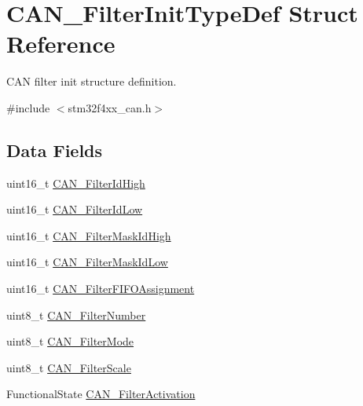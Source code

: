 \hypertarget{struct_c_a_n___filter_init_type_def}{\section{C\-A\-N\-\_\-\-Filter\-Init\-Type\-Def Struct Reference}
\label{struct_c_a_n___filter_init_type_def}
}


C\-A\-N filter init structure definition.  




{\ttfamily \#include $<$stm32f4xx\-\_\-can.\-h$>$}

\subsection*{Data Fields}
\begin{DoxyCompactItemize}
\item 
uint16\-\_\-t \hyperlink{struct_c_a_n___filter_init_type_def_ac1368e531f4dd6ff08445ae664a9b96c}{C\-A\-N\-\_\-\-Filter\-Id\-High}
\item 
uint16\-\_\-t \hyperlink{struct_c_a_n___filter_init_type_def_a3ca3a0b0d3b7617b8bb5bbb7d4ca23cf}{C\-A\-N\-\_\-\-Filter\-Id\-Low}
\item 
uint16\-\_\-t \hyperlink{struct_c_a_n___filter_init_type_def_a66d56c2f432920189ae4b046c325fba6}{C\-A\-N\-\_\-\-Filter\-Mask\-Id\-High}
\item 
uint16\-\_\-t \hyperlink{struct_c_a_n___filter_init_type_def_a3677d330355ee09293b3ee8c055b58a5}{C\-A\-N\-\_\-\-Filter\-Mask\-Id\-Low}
\item 
uint16\-\_\-t \hyperlink{struct_c_a_n___filter_init_type_def_a9581cf60f03a7c1edcd03de3783c8bf1}{C\-A\-N\-\_\-\-Filter\-F\-I\-F\-O\-Assignment}
\item 
uint8\-\_\-t \hyperlink{struct_c_a_n___filter_init_type_def_a4657eff323f0e2d379115fd06f5c8d74}{C\-A\-N\-\_\-\-Filter\-Number}
\item 
uint8\-\_\-t \hyperlink{struct_c_a_n___filter_init_type_def_a0fecca0da838d863a15294277db8f8fe}{C\-A\-N\-\_\-\-Filter\-Mode}
\item 
uint8\-\_\-t \hyperlink{struct_c_a_n___filter_init_type_def_a434a665b1a2781348818d285dd18b6d5}{C\-A\-N\-\_\-\-Filter\-Scale}
\item 
Functional\-State \hyperlink{struct_c_a_n___filter_init_type_def_a193c0ae1b3982478eeca47470a1ee075}{C\-A\-N\-\_\-\-Filter\-Activation}
\end{DoxyCompactItemize}


